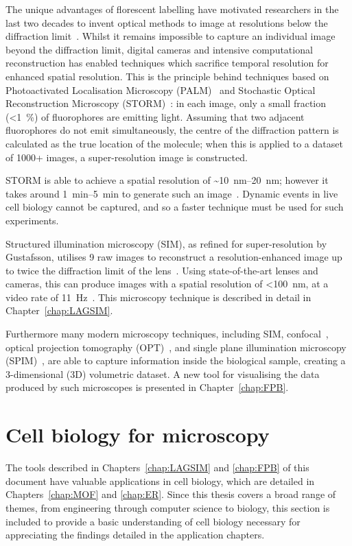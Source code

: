 The unique advantages of florescent labelling have motivated researchers in the last two decades to invent optical methods to image at resolutions below the diffraction limit~\cite{cornea2014fluorescence}.
Whilst it remains impossible to capture an individual image beyond the diffraction limit, digital cameras and intensive computational reconstruction has enabled techniques which sacrifice temporal resolution for enhanced spatial resolution.
This is the principle behind techniques based on Photoactivated Localisation Microscopy (PALM)~\cite{betzig2006imaging} and Stochastic Optical Reconstruction Microscopy (STORM)~\cite{rust2006sub}: in each image, only a small fraction (<\SI{1}{\percent}) of fluorophores are emitting light.
Assuming that two adjacent fluorophores do not emit simultaneously, the centre of the diffraction pattern is calculated as the true location of the molecule; when this is applied to a dataset of \num{1000}+ images, a super-resolution image is constructed. 

STORM is able to achieve a spatial resolution of \textasciitilde\SIrange[range-phrase=--]{10}{20}{\nano\metre}; however it takes around \SIrange[range-phrase=--]{1}{5}{\minute} to generate such an image~\cite{heilemann2008subdiffraction}.
Dynamic events in live cell biology cannot be captured, and so a faster technique must be used for such experiments. 

Structured illumination microscopy (SIM), as refined for super-resolution by Gustafsson, utilises 9 raw images to reconstruct a resolution-enhanced image up to twice the diffraction limit of the lens~\cite{gustafsson2000surpassing}.
Using state-of-the-art lenses and cameras, this can produce images with a spatial resolution of <\SI{100}{\nano\metre}, at a video rate of \SI{11}{\hertz}~\cite{young2016guide}.  
This microscopy technique is described in detail in Chapter~\ref{chap:LAGSIM}. 

Furthermore many modern microscopy techniques, including SIM, confocal~\cite{white1987evaluation, marvin1961microscopy}, optical projection tomography (OPT)~\cite{sharpe2002optical}, and single plane illumination microscopy (SPIM)~\cite{huisken2004optical}, are able to capture information inside the biological sample, creating a 3-dimensional (3D) volumetric dataset. 
A new tool for visualising the data produced by such microscopes is presented in Chapter~\ref{chap:FPB}. 


\section{Cell biology for microscopy}
The tools described in Chapters~\ref{chap:LAGSIM} and \ref{chap:FPB} of this document have valuable applications in cell biology, which are detailed in Chapters~\ref{chap:MOF} and \ref{chap:ER}.
Since this thesis covers a broad range of themes, from engineering through computer science to biology, this section is included to provide a basic understanding of cell biology necessary for appreciating the findings detailed in the application chapters. 

